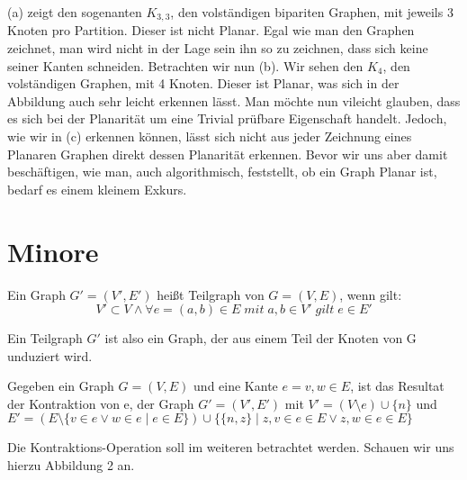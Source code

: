 \documentclass[runningheads]{llncs}
\begin{document}
(a) zeigt den sogenanten $K_{3,3}$, den
volständigen bipariten Graphen, mit jeweils 3 Knoten pro Partition. Dieser ist nicht Planar. Egal wie man den Graphen
zeichnet, man wird nicht in der Lage sein ihn so zu zeichnen, dass sich keine seiner Kanten schneiden. Betrachten wir
nun (b). Wir sehen den $K_4$, den volständigen Graphen, mit 4 Knoten. Dieser ist Planar, was sich in der Abbildung auch
sehr leicht erkennen lässt. Man möchte nun vileicht glauben, dass es sich bei der Planarität um eine Trivial prüfbare
Eigenschaft handelt. Jedoch, wie wir in (c) erkennen können, lässt sich nicht aus jeder Zeichnung eines Planaren Graphen
direkt dessen Planarität erkennen. Bevor wir uns aber damit beschäftigen, wie man, auch algorithmisch, feststellt, ob ein
Graph Planar ist, bedarf es einem kleinem Exkurs. 


\section{Minore}
\begin{definition}[Teilgraph]
    Ein Graph $G' = (V', E') $ heißt Teilgraph von $G = (V, E)$, wenn gilt:
    \[V' \subset V \land \forall e =(a, b) \in E \;mit\;  a,b \in V' \; gilt \; e \in E'\]
\end{definition}
Ein Teilgraph $G'$ ist also ein Graph, der aus einem Teil der Knoten von G unduziert wird. 
\begin{definition}[Kantenkontraktion]
    Gegeben ein Graph $G = (V,E)$ und eine Kante $ e = {v, w} \in E $, ist das Resultat der Kontraktion von e, der Graph $G' = (V', E')$ mit
    $V' = (V \setminus e) \cup \{n \}$ und $E' = (E \setminus \{v \in e \lor w \in e  \mid e \in E \}) \cup \{ \{n, z\} \mid z,v \in e \in E \lor z,w \in e \in E\}$
\end{definition}
Die Kontraktions-Operation soll im weiteren betrachtet werden. Schauen wir uns hierzu Abbildung 2 an.
\end{document}

